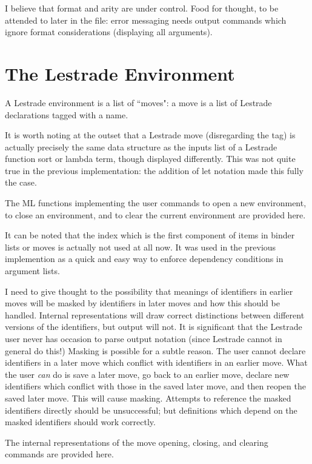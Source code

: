 \documentclass[12pt]{article}
\begin{document}
I believe that format and arity are under control.  Food for thought, to be attended to later in the file:  error messaging needs output commands which ignore format considerations (displaying all arguments).

\newpage

\section{The Lestrade Environment}

A Lestrade environment is a list of ``moves": a move is a list of Lestrade declarations tagged with a name.

It is worth noting at the outset that a Lestrade move (disregarding the tag) is actually precisely the same data structure as the inputs list of a Lestrade function sort or lambda term, though displayed differently.  This was not quite true in the previous implementation:
the addition of let notation made this fully the case.

The ML functions implementing the user commands to open a new environment, to close an environment, and to clear the current environment are provided here.

It can be noted that the index which is the first component of items in binder lists or moves is actually not used at all now.  It was used in the previous implemention
as a quick and easy way to enforce dependency conditions in argument lists.

I need to give thought to the possibility that meanings of identifiers in earlier moves will be masked by identifiers in later moves and how this should be handled.  Internal
representations will draw correct distinctions between different versions of the identifiers, but output will not.  It is significant that the Lestrade user never has occasion
to parse output notation (since Lestrade cannot in general do this!)  Masking is possible for a subtle reason.  The user cannot declare identifiers in a later move which conflict with identifiers in an earlier move. What the user {\em can\/} do is save a later move, go back to an earlier move, declare new identifiers which conflict with those in the saved later move, and then reopen the saved later move.  This will cause masking.  Attempts to reference the masked identifiers directly should be unsuccessful;  but definitions which depend on the masked identifiers should work correctly.

The internal representations of the move opening, closing, and clearing commands are provided here.
\end{document}
